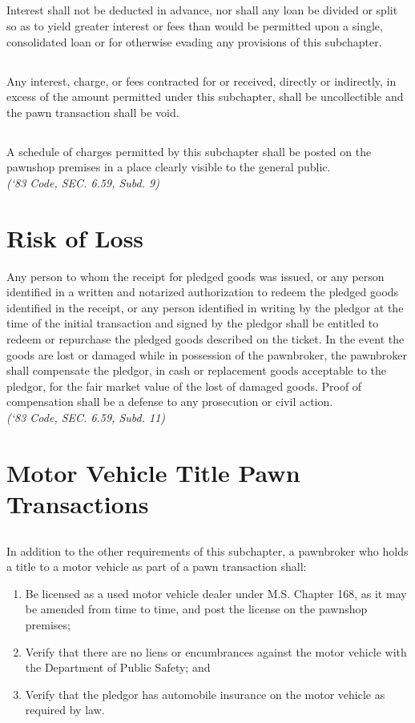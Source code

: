 \subsection{}
Interest shall not be deducted in advance, nor shall any loan be divided or split so as to yield greater interest or fees than would be permitted upon a single, consolidated loan or for otherwise evading any provisions of this subchapter.
\subsection{}
Any interest, charge, or fees contracted for or received, directly or indirectly, in excess of the amount permitted under this subchapter, shall be uncollectible and the pawn transaction shall be void.
\subsection{}
A schedule of charges permitted by this subchapter shall be posted on the pawnshop premises in a place clearly visible to the general public.\\
\emph{(‘83 Code, SEC. 6.59, Subd. 9)}
\section{Risk of Loss}
Any person to whom the receipt for pledged goods was issued, or any person identified in a written and notarized authorization to redeem the pledged goods identified in the receipt, or any person identified in writing by the pledgor at the time of the initial transaction and signed by the pledgor shall be entitled to redeem or repurchase the pledged goods described on the ticket.  In the event the goods are lost or damaged while in possession of the pawnbroker, the pawnbroker shall compensate the pledgor, in cash or replacement goods acceptable to the pledgor, for the fair market value of the lost of damaged goods.  Proof of compensation shall be a defense to any prosecution or civil action.\\
\emph{(‘83 Code, SEC. 6.59, Subd. 11)}
\section{Motor Vehicle Title Pawn Transactions}
\subsection{}
In addition to the other requirements of this subchapter, a pawnbroker who holds a title to a motor vehicle as part of a pawn transaction shall:
\begin{enumerate}[{\indent}1)]
    \item Be licensed as a used motor vehicle dealer under M.S. Chapter 168, as it may be amended from time to time, and post the license on the pawnshop premises;
    \item Verify that there are no liens or encumbrances against the motor vehicle with the Department of Public Safety; and
    \item Verify that the pledgor has automobile insurance on the motor vehicle as required by law.
\end{enumerate}
